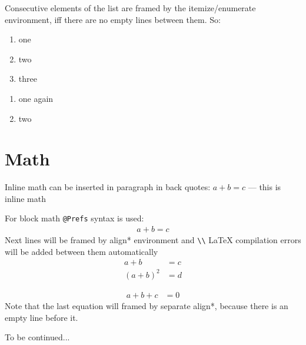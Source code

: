 \documentclass[12pt,a4paper,oneside]{article} \usepackage[utf8]{inputenc} \usepackage{amsmath}
\begin{document}
    Consecutive elements of the list are framed by the itemize/enumerate environment, iff there are
    no empty lines between them. So:
    \begin{enumerate}
      \item one
      \item two
      \item three
    \end{enumerate}

    \begin{enumerate}
      \item one again
      \item two
    \end{enumerate}

  \section{Math}
    Inline math can be inserted in paragraph in back quotes: $a + b = c$  --- this is inline math

    For block math \texttt{@Prefs} syntax is used:
    \begin{align*}
      a + b = c
    \end{align*}
    Next lines will be framed by align* environment and \verb.\\. %
    LaTeX compilation errors will be added between them automatically
    \begin{align*}
      a + b &= c\\
      (a + b)^2 &= d
    \end{align*}

    \begin{align*}
      a + b + c &= 0
    \end{align*}
    Note that the last equation will framed by separate align*, because there is an empty line
    before it.

  To be continued...
\end{document}
